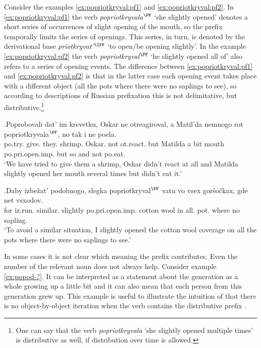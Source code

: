 Consider the examples \ref{ex:popriotkryval:pf1} and \ref{ex:popriotkryval:pf2}. In \ref{ex:popriotkryval:pf1} the verb \textit{popriotkryvala}$^{\PF}$ `she slightly opened' denotes a short series of occurrences of slight opening of the mouth, so the prefix  temporally limits the series of openings. This series, in turn, is denoted by the derivational base \textit{priotkryvat'}$^{\IPF}$ `to open/be opening slightly'. In the example \ref{ex:popriotkryval:pf2} the verb  \textit{popriotkryval}$^{\PF}$ `he slightly opened all of' also refers to a series of opening events. The difference between \ref{ex:popriotkryval:pf1} and \ref{ex:popriotkryval:pf2} is that in the latter case each opening event takes place with a different object (all the pots where there were no saplings to see), so according to descriptions of Russian prefixation this  is not delimitative, but distributive.\footnote{One can say that the verb \textit{popriotkryvala} `she slightly opened multiple times' is distributive as well, if distribution over time is allowed.}

\exg.\label{ex:popriotkryval:pf1}Poprobovali dat' im krevetku, Oskar ne otreagiroval, a Matil'da nemnogo rot popriotkryvala$^{\PF}$, no tak i ne poela.\\
po.try. give. they. shrimp. Oskar. not ot.react. but Matilda {a bit} mouth po.pri.open.imp. but so and not po.eat.\\
\trans `We have tried to give them a shrimp, Oskar didn't react at all and Matilda slightly opened her mouth several times but didn't eat it.'\\

\exg.\label{ex:popriotkryval:pf2}Daby izbe\v{z}at' podobnogo, slegka popriotkryval$^{\PF}$ vatu vo vsex gor\v{s}o\v{c}kax, gde net vsxodov.\\
for iz.run. similar. slightly po.pri.open.imp. {cotton wool} in all. pot. where no sapling.\\
\trans `To avoid a similar situation, I slightly opened the cotton wool coverage on all the pots where there were no saplings to see.'\\

In some cases it is not clear which meaning the prefix contributes. Even the number of the relevant noun does not always help. Consider example \ref{ex:popod-?}. It can be interpreted as a statement about the generation as a whole growing up a little bit and it can also mean that each person from this generation grew up. This example is useful to illustrate the intuition of \citet{Isachenko:60} that there is no object-by-object iteration when the verb contains the distributive prefix .

